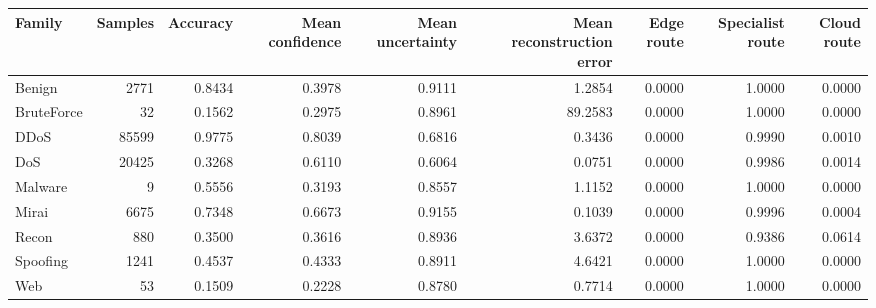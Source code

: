 \begin{tabular}{lrrrrrrrr}
\toprule
Family & Samples & Accuracy & Mean confidence & Mean uncertainty & Mean reconstruction error & Edge route & Specialist route & Cloud route \\
\midrule
Benign & 2771 & 0.8434 & 0.3978 & 0.9111 & 1.2854 & 0.0000 & 1.0000 & 0.0000 \\
BruteForce & 32 & 0.1562 & 0.2975 & 0.8961 & 89.2583 & 0.0000 & 1.0000 & 0.0000 \\
DDoS & 85599 & 0.9775 & 0.8039 & 0.6816 & 0.3436 & 0.0000 & 0.9990 & 0.0010 \\
DoS & 20425 & 0.3268 & 0.6110 & 0.6064 & 0.0751 & 0.0000 & 0.9986 & 0.0014 \\
Malware & 9 & 0.5556 & 0.3193 & 0.8557 & 1.1152 & 0.0000 & 1.0000 & 0.0000 \\
Mirai & 6675 & 0.7348 & 0.6673 & 0.9155 & 0.1039 & 0.0000 & 0.9996 & 0.0004 \\
Recon & 880 & 0.3500 & 0.3616 & 0.8936 & 3.6372 & 0.0000 & 0.9386 & 0.0614 \\
Spoofing & 1241 & 0.4537 & 0.4333 & 0.8911 & 4.6421 & 0.0000 & 1.0000 & 0.0000 \\
Web & 53 & 0.1509 & 0.2228 & 0.8780 & 0.7714 & 0.0000 & 1.0000 & 0.0000 \\
\bottomrule
\end{tabular}
